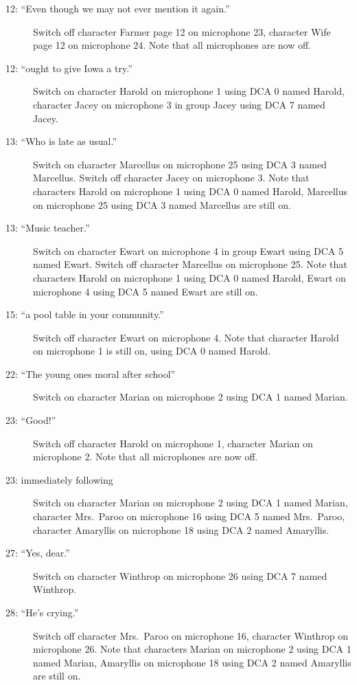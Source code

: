 \begin{description}
\item[12: ``Even though we may not ever mention it again.'']
Switch off character Farmer page 12 on microphone 23, character Wife page 12 on microphone 24. Note that all microphones are now off.

\item[12: ``ought to give Iowa a try.'']
Switch on character Harold on microphone 1 using DCA 0 named Harold, character Jacey on microphone 3 in group Jacey using DCA 7 named Jacey. 

\item[13: ``Who is late as usual.'']
Switch on character Marcellus on microphone 25 using DCA 3 named Marcellus. Switch off character Jacey on microphone 3. Note that characters Harold on microphone 1 using DCA 0 named Harold, Marcellus on microphone 25 using DCA 3 named Marcellus are still on.  

\item[13: ``Music teacher.'']
Switch on character Ewart on microphone 4 in group Ewart using DCA 5 named Ewart. Switch off character Marcellus on microphone 25. Note that characters Harold on microphone 1 using DCA 0 named Harold, Ewart on microphone 4 using DCA 5 named Ewart are still on.  

\item[15: ``a pool table in your community.'']
Switch off character Ewart on microphone 4. Note that character Harold on microphone 1 is still on, using DCA 0 named Harold.

\item[22: ``The young ones moral after school'']
Switch on character Marian on microphone 2 using DCA 1 named Marian. 

\item[23: ``Good!'']
Switch off character Harold on microphone 1, character Marian on microphone 2. Note that all microphones are now off.

\item[23: immediately following]
Switch on character Marian on microphone 2 using DCA 1 named Marian, character Mrs.~Paroo on microphone 16 using DCA 5 named Mrs.~Paroo, character Amaryllis on microphone 18 using DCA 2 named Amaryllis. 

\item[27: ``Yes, dear.'']
Switch on character Winthrop on microphone 26 using DCA 7 named Winthrop. 

\item[28: ``He's crying.'']
Switch off character Mrs.~Paroo on microphone 16, character Winthrop on microphone 26. Note that characters Marian on microphone 2 using DCA 1 named Marian, Amaryllis on microphone 18 using DCA 2 named Amaryllis are still on.  


\end{description}
